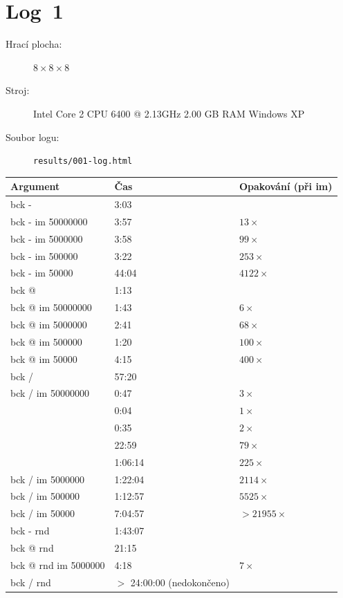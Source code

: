\documentclass[11pt, titlepage]{report}
\begin{document}
\section{Log~1}
\label{log1}

\begin{description}
\item[Hrací plocha:] $8 \times 8 \times 8$
\item[Stroj:] Intel Core 2 CPU 6400 @ 2.13GHz 2.00 GB RAM Windows XP
\item[Soubor logu:] \texttt{results/001-log.html}
\end{description}

\begin{tabular}{|l|l|l|}
\hline
\textbf{Argument} & \textbf{Čas} & \textbf{Opakování (při im)} \\
\hline
bck - & 3:03 & \\
bck - im 50000000 & 3:57 & $13 \times$ \\
bck - im 5000000 & 3:58 & $99 \times$ \\
bck - im 500000 & 3:22 & $253 \times$ \\
bck - im 50000 & 44:04 & $4122 \times$ \\
bck @ & 1:13 & \\
bck @ im 50000000 & 1:43 & $6 \times$ \\
bck @ im 5000000 & 2:41 & $68 \times$ \\
bck @ im 500000 & 1:20 & $100 \times$ \\
bck @ im 50000 & 4:15 & $400 \times$ \\
bck / & 57:20 & \\
bck / im 50000000 & 0:47 & $3 \times$ \\
& 0:04 & $1 \times$ \\
& 0:35 & $2 \times$ \\
& 22:59 & $79 \times$ \\
& 1:06:14 & $225 \times$ \\
bck / im 5000000 & 1:22:04 & $2114 \times$ \\
bck / im 500000 & 1:12:57 & $5525 \times$ \\
bck / im 50000 & 7:04:57 & $> 21955 \times$ \\
bck - rnd & 1:43:07 & \\
bck @ rnd & 21:15 & \\
bck @ rnd im 5000000 & 4:18 & $7 \times$ \\
bck / rnd & $>$ 24:00:00 (nedokončeno) & \\
\hline
\end{tabular}
\end{document}
